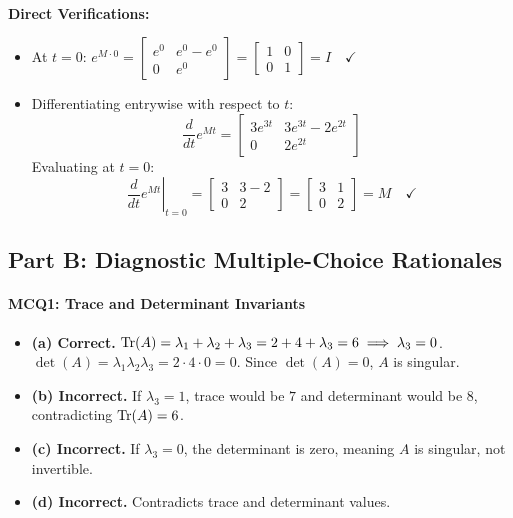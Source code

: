 \begin{enumerate}[label=(\alph*)]
\begin{align*}
    \end{align*}
    \textbf{Direct Verifications:}
    \begin{itemize}
        \item At $t = 0$: $e^{M \cdot 0} = \begin{bmatrix} e^0 & e^0 - e^0 \\ 0 & e^0 \end{bmatrix} = \begin{bmatrix} 1 & 0 \\ 0 & 1 \end{bmatrix} = I \quad \checkmark$
        \item Differentiating entrywise with respect to $t$:
        \[
        \frac{d}{dt} e^{Mt} = \begin{bmatrix} 3e^{3t} & 3e^{3t} - 2e^{2t} \\ 0 & 2e^{2t} \end{bmatrix}
        \]
        Evaluating at $t = 0$:
        \[
        \left.\frac{d}{dt} e^{Mt}\right|_{t=0} = \begin{bmatrix} 3 & 3 - 2 \\ 0 & 2 \end{bmatrix} = \begin{bmatrix} 3 & 1 \\ 0 & 2 \end{bmatrix} = M \quad \checkmark
        \]
    \end{itemize}
\end{enumerate}

\subsection*{Part B: Diagnostic Multiple-Choice Rationales}

\paragraph{MCQ1: Trace and Determinant Invariants}
\begin{itemize}
    \item \textbf{(a) Correct.} $\operatorname{Tr}(A) = \lambda_1 + \lambda_2 + \lambda_3 = 2 + 4 + \lambda_3 = 6 \implies \lambda_3 = 0$. $\det(A) = \lambda_1 \lambda_2 \lambda_3 = 2 \cdot 4 \cdot 0 = 0$. Since $\det(A) = 0$, $A$ is singular.
    \item \textbf{(b) Incorrect.} If $\lambda_3 = 1$, trace would be $7$ and determinant would be $8$, contradicting $\operatorname{Tr}(A) = 6$.
    \item \textbf{(c) Incorrect.} If $\lambda_3 = 0$, the determinant is zero, meaning $A$ is singular, not invertible.
    \item \textbf{(d) Incorrect.} Contradicts trace and determinant values.
\end{itemize}

